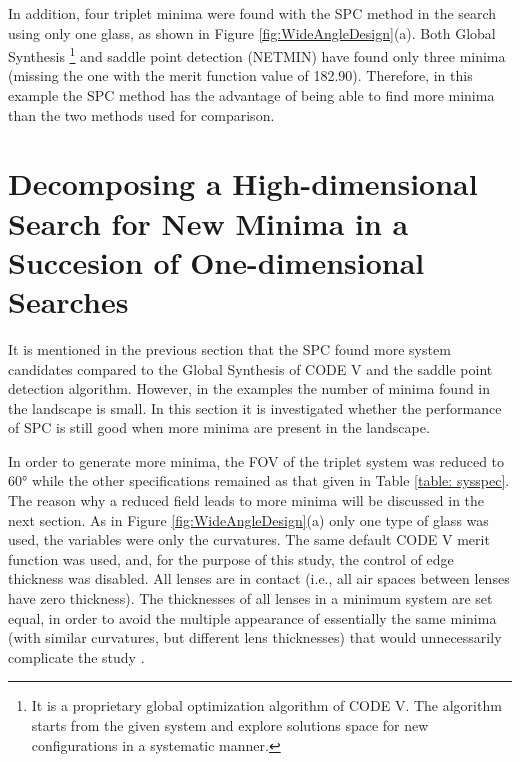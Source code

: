 In addition, four triplet minima were found with the SPC method in the search using only one glass, as shown in Figure \ref{fig:WideAngleDesign}(a). Both Global Synthesis \footnote{It is a proprietary global optimization algorithm of CODE V. The algorithm starts from the given system and explore solutions space for new configurations in a systematic manner.} and saddle point detection
(NETMIN) have found only three minima (missing the one with the merit function value of 182.90). Therefore, in this example the SPC method has the advantage of being able to find more minima than the two methods used for comparison. 

\section{Decomposing a High-dimensional Search for New Minima in a Succesion of One-dimensional Searches}  \label{chrom60d}

It is mentioned in the previous section that the SPC found more system candidates compared to the Global Synthesis of CODE V and the saddle point detection algorithm. However, in the examples the number of minima found in the landscape is small. In this section it is investigated whether the performance of SPC is still good when more minima are present in the landscape.

In order to generate more minima, the FOV of the triplet system was reduced to 60° while the other specifications remained as that given in Table \ref{table: sysspec}. The reason why a reduced
field leads to more minima will be discussed in the next section.
As in Figure \ref{fig:WideAngleDesign}(a) only one type of glass was used, the variables were only the curvatures. The same default CODE V merit function was used, and, for the purpose of this study, the control of edge thickness was disabled. All lenses are in contact (i.e., all air spaces between lenses have zero thickness). The thicknesses of all lenses in a minimum system are set equal, in order to avoid the multiple appearance of essentially the same minima (with similar curvatures, but different lens thicknesses) that would unnecessarily complicate the study \cite{HouProc2015}.

